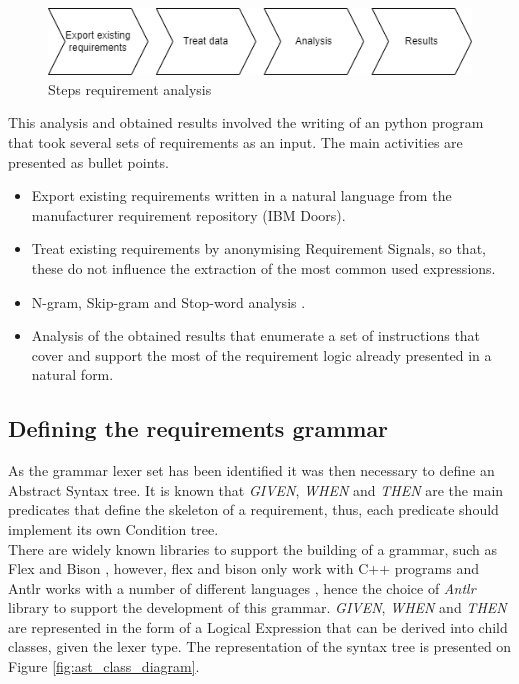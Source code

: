 \begin{figure}[H]
    \centering
    \includegraphics[width=\textwidth]{images/diag_ngram.png}
    \caption{Steps requirement analysis}
    \label{fig:diag_ngram_req_analysis}
\end{figure}

This analysis and obtained results involved the writing of an python program that took several sets of requirements as an input. The main activities are presented as bullet points.

\begin{itemize}
    \item Export existing requirements written in a natural language from the manufacturer requirement repository (IBM Doors).
    \item Treat existing requirements by anonymising Requirement Signals, so that, these do not influence the extraction of the most common used expressions.
    \item N-gram, Skip-gram and Stop-word analysis \cite{alajmi2012toward}.
    \item Analysis of the obtained results that enumerate a set of instructions that cover and support the most of the requirement logic already presented in a natural form.
\end{itemize}




\subsection{Defining the requirements grammar}
\label{sec:def_req_grammar}

As the grammar lexer set has been identified it was then necessary to define an Abstract Syntax tree. It is known that \textit{GIVEN}, \textit{WHEN} and \textit{THEN} are the main predicates that define the skeleton of a requirement, thus, each predicate should implement its own Condition tree.\\
There are widely known libraries to support the building of a grammar, such as Flex and Bison \cite{levine_flex_2009}, however, flex and bison only work with C++ programs and Antlr works with a number of different languages \cite{antlr_site}, hence the choice of \textit{Antlr} library to support the development of this grammar. \textit{GIVEN}, \textit{WHEN} and \textit{THEN} are represented in the form of a Logical Expression that can be derived into child classes, given the lexer type. The representation of the syntax tree is presented on Figure \ref{fig:ast_class_diagram}.

